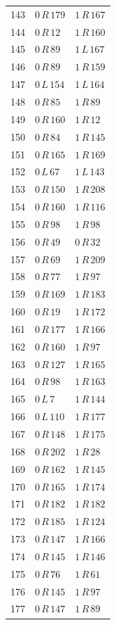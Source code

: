\begin{longtable}{rll}
143 & $0\,R\,179$ & $1\,R\,167$ \\
144 & $0\,R\,12$ & $1\,R\,160$ \\
145 & $0\,R\,89$ & $1\,L\,167$ \\
146 & $0\,R\,89$ & $1\,R\,159$ \\
147 & $0\,L\,154$ & $1\,L\,164$ \\
148 & $0\,R\,85$ & $1\,R\,89$ \\
149 & $0\,R\,160$ & $1\,R\,12$ \\
150 & $0\,R\,84$ & $1\,R\,145$ \\
151 & $0\,R\,165$ & $1\,R\,169$ \\
152 & $0\,L\,67$ & $1\,L\,143$ \\
153 & $0\,R\,150$ & $1\,R\,208$ \\
154 & $0\,R\,160$ & $1\,R\,116$ \\
155 & $0\,R\,98$ & $1\,R\,98$ \\
156 & $0\,R\,49$ & $0\,R\,32$ \\
157 & $0\,R\,69$ & $1\,R\,209$ \\
158 & $0\,R\,77$ & $1\,R\,97$ \\
159 & $0\,R\,169$ & $1\,R\,183$ \\
160 & $0\,R\,19$ & $1\,R\,172$ \\
161 & $0\,R\,177$ & $1\,R\,166$ \\
162 & $0\,R\,160$ & $1\,R\,97$ \\
163 & $0\,R\,127$ & $1\,R\,165$ \\
164 & $0\,R\,98$ & $1\,R\,163$ \\
165 & $0\,L\,7$ & $1\,R\,144$ \\
166 & $0\,L\,110$ & $1\,R\,177$ \\
167 & $0\,R\,148$ & $1\,R\,175$ \\
168 & $0\,R\,202$ & $1\,R\,28$ \\
169 & $0\,R\,162$ & $1\,R\,145$ \\
170 & $0\,R\,165$ & $1\,R\,174$ \\
171 & $0\,R\,182$ & $1\,R\,182$ \\
172 & $0\,R\,185$ & $1\,R\,124$ \\
173 & $0\,R\,147$ & $1\,R\,166$ \\
174 & $0\,R\,145$ & $1\,R\,146$ \\
175 & $0\,R\,76$ & $1\,R\,61$ \\
176 & $0\,R\,145$ & $1\,R\,97$ \\
177 & $0\,R\,147$ & $1\,R\,89$ \\

\end{longtable}
